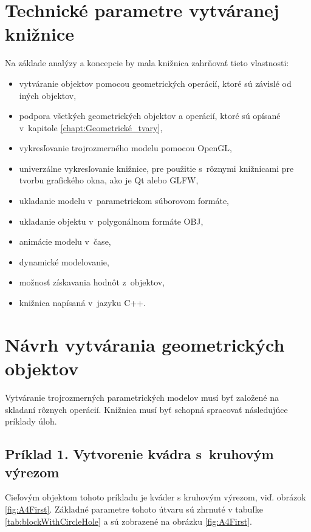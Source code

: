 \section{Technické parametre vytváranej knižnice}
Na základe analýzy a koncepcie  by mala knižnica zahrňovať tieto vlastnosti:
\begin{itemize}
\item vytváranie objektov pomocou geometrických operácií, ktoré sú závislé od iných objektov,
\item podpora všetkých geometrických objektov a operácií, ktoré sú opísané v~kapitole \ref{chapt:Geometrické_tvary},
\item vykresľovanie trojrozmerného modelu pomocou OpenGL,
\item univerzálne vykresľovanie knižnice, pre použitie s~rôznymi knižnicami pre tvorbu grafického okna, ako je Qt alebo GLFW,
\item ukladanie modelu v~parametrickom súborovom formáte,
\item ukladanie objektu v~polygonálnom formáte  OBJ,
\item animácie modelu v~čase,
\item dynamické modelovanie,
\item možnosť získavania hodnôt z~objektov,
\item knižnica napísaná v~jazyku C++.
\end{itemize}


\section{Návrh vytvárania geometrických objektov} \label{sec:navrhOperacii}
Vytváranie trojrozmerných parametrických modelov musí byť založené na skladaní rôznych operácií. 
Knižnica musí byť schopná spracovať následujúce príklady úloh.

\subsection*{Príklad 1. Vytvorenie kvádra s~kruhovým výrezom}
Cieľovým objektom tohoto príkladu je kváder s kruhovým výrezom, viď. obrázok \ref{fig:A4First}. Základné parametre tohoto útvaru sú zhrnuté v tabuľke \ref{tab:blockWithCircleHole}  a sú zobrazené na obrázku \ref{fig:A4First}.

